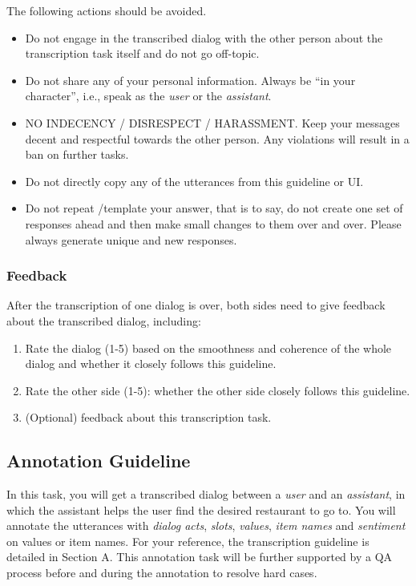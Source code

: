 \documentclass[11pt,a4paper]{article}
\begin{document}
The following actions should be avoided.
\begin{itemize}
\itemsep0em
    \item Do not engage in the transcribed dialog with the other person about the transcription task itself and do not go off-topic. 
    \item Do not share any of your personal information. Always be ``in your character'', i.e., speak as the \textit{user} or the \textit{assistant}.
    \item NO INDECENCY / DISRESPECT / HARASSMENT. Keep your messages decent and respectful towards the other person. Any violations will result in a ban on further tasks.
    \item Do not directly copy any of the utterances from this guideline or UI.
    \item Do not repeat /template your answer, that is to say, do not create one set of responses ahead and then make small changes to them over and over. Please always generate unique and new responses.
\end{itemize}

\subsubsection{Feedback}
After the transcription of one dialog is over, both sides need to give feedback about the transcribed dialog, including:
\begin{enumerate}
\itemsep0em
    \item Rate the dialog (1-5) based on the smoothness and coherence of the whole dialog and whether it closely follows this guideline.
    \item Rate the other side (1-5): whether the other side closely follows this guideline.
    \item (Optional) feedback about this transcription task.
\end{enumerate}




\newpage
\subsection{Annotation Guideline}
\label{sec:transcrib}
In this task, you will get a transcribed dialog between a \textit{user} and an \textit{assistant}, in which the assistant helps the user find the desired restaurant to go to. You will annotate the utterances with \textit{dialog acts}, \textit{slots}, \textit{values}, \textit{item names} and \textit{sentiment} on values or item names. For your reference, the transcription guideline is detailed in Section A. This annotation task will be further supported by a QA process before and during the annotation to resolve hard cases.
\end{document}
